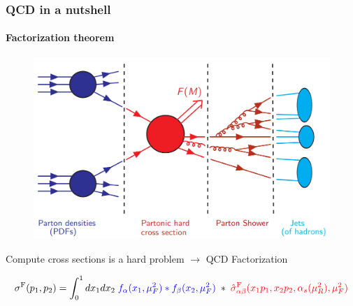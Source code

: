 \documentclass[aspectratio=43]{beamer}
\begin{document}
\begin{frame}

\frametitle{QCD in a nutshell}
\framesubtitle{Factorization theorem}

\begin{figure}
	\includegraphics[width = 7 cm]{plots/factorization_1.png}
\end{figure}

Compute cross sections is a {\color{red}hard problem} $\longrightarrow$ {\color{blue} QCD Factorization}

\begin{equation}
	\sigma^{\textrm{F}}(p_{1}, p_{2}) =
	\int_{0}^{1} dx_{1} dx_{2} \; {\color{blue} f_{\alpha}(x_{1}, \mu_{F}^{2}) \ast f_{\beta}(x_{2}, \mu_{F}^{2})}
	\; \ast \;  
	{\color{red}\hat{\sigma}^{\textrm{F}}_{\alpha \beta}(x_{1}p_{1}, x_{2}p_{2}, \alpha_{s}(\mu_{R}^{2}), \mu_{F}^{2})} \nonumber
\end{equation}

\end{frame}
\end{document}
